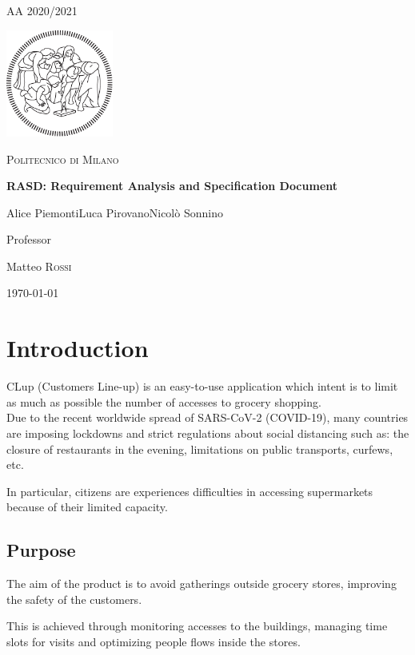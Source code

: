 \documentclass[12pt]{article}
\begin{document}
\begin{titlepage}
    \centering
    {\scshape\large AA 2020/2021 \par}
    \vfill
    \includegraphics[width=100pt]{assets/logo-polimi-new}\par\vspace{1cm}
    {\scshape\LARGE Politecnico di Milano \par}
    \vspace{1.5cm}
    {\huge\bfseries RASD\@: Requirement Analysis
        and Specification Document \par}
    \vspace{2cm}
    {\Large {Alice Piemonti\quad Luca Pirovano\quad Nicolò Sonnino}\par}
    \vfill
    {\large Professor\par
        Matteo \textsc{Rossi}}
    \vfill
    {\large \today \par}
\end{titlepage}
\tableofcontents
\newpage
\section{Introduction}
CLup (Customers Line-up) is an easy-to-use application which intent is to limit as much as possible the number of accesses to grocery shopping.\\

Due to the recent worldwide spread of SARS-CoV-2 (COVID-19), many countries are imposing lockdowns and strict regulations about social distancing such as: the closure of restaurants in the evening, limitations on public transports, curfews, etc.

In particular, citizens are experiences difficulties in accessing supermarkets because of their limited capacity.
\subsection{Purpose}
The aim of the product is to avoid gatherings outside grocery stores, improving the safety of the customers.

This is achieved through monitoring accesses to the buildings, managing time slots for visits and optimizing people flows inside the stores.\\
\end{document}
